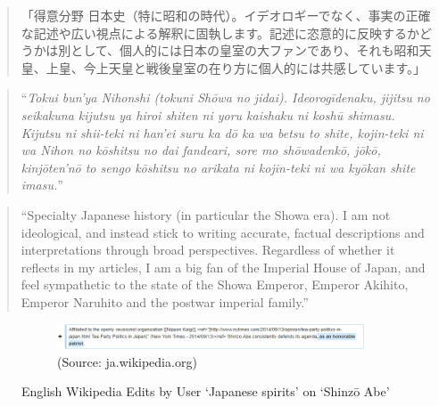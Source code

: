\documentclass[10pt,british,A4paper,oneside]{memoir}
\begin{document}
\begin{quote}
「得意分野\newline
日本史（特に昭和の時代）。イデオロギーでなく、事実の正確な記述や広い視点による解釈に固執します。記述に恣意的に反映するかどうかは別として、個人的には日本の皇室の大ファンであり、それも昭和天皇、上皇、今上天皇と戦後皇室の在り方に個人的には共感しています。」
\end{quote}

\begin{quote}
``\emph{Tokui bun'ya\newline
Nihonshi (tokuni Shōwa no jidai). Ideorogīdenaku, jijitsu no seikakuna
kijutsu ya hiroi shiten ni yoru kaishaku ni koshū shimasu. Kijutsu ni
shii-teki ni han'ei suru ka dō ka wa betsu to shite, kojin-teki ni wa
Nihon no kōshitsu no dai fandeari, sore mo shōwadenkō, jōkō, kinjōten'nō
to sengo kōshitsu no arikata ni kojin-teki ni wa kyōkan shite imasu.}''
\end{quote}

\begin{quote}
``Specialty\newline
Japanese history (in particular the Showa era). I am not ideological,
and instead stick to writing accurate, factual descriptions and
interpretations through broad perspectives. Regardless of whether it
reflects in my articles, I am a big fan of the Imperial House of Japan,
and feel sympathetic to the state of the Showa Emperor, Emperor Akihito,
Emperor Naruhito and the postwar imperial family.''
\end{quote}

\begin{figure}[!htb]
 \centering
 \begin{subfigure}[b]{1\textwidth}
 \includegraphics[width=.9\textwidth]{images/wiki/japanese-spirits-abe.jpg}
 \caption*{(Source: ja.wikipedia.org)}
 \end{subfigure}
 \caption{English Wikipedia Edits by User `Japanese spirits' on `Shinzō Abe'}\label{fig:js-abe}
\end{figure}
\end{document}
